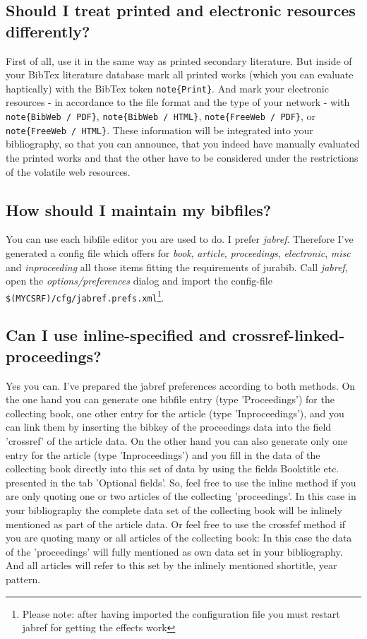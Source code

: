 \documentclass[
  DIV=calc,
  BCOR=5mm,
  11pt,
  headings=small,
  oneside,
  abstract=true,
  toc=bib,
  ngerman,english]{scrartcl}
\begin{document}
\subsection{Should I treat printed and electronic resources differently?}
First of all, use it in the same way as printed secondary literature. But inside
of your BibTex literature database mark all printed works (which you can
evaluate haptically) with the BibTex token \texttt{note\{Print\}}. And mark your
electronic resources - in accordance to the file format and the type of your
network - with \texttt{note\{BibWeb / PDF\}}, \texttt{note\{BibWeb / HTML\}},
\texttt{note\{FreeWeb / PDF\}}, or \texttt{note\{FreeWeb / HTML\}}. These
information will be integrated into your bibliography, so that you can announce,
that you indeed have manually evaluated the printed works and that the other
have to be considered under the restrictions of the volatile web resources.

\subsection{How should I maintain my bibfiles?}
You can use each bibfile editor you are used to do. I prefer \textit{jabref}.
There\-fo\-re I've generated a config file which offers for \textit{book},
\textit{article}, \textit{proceedings}, \textit{elec\-tro\-nic}, \textit{misc}
and \textit{inproceeding} all those items fitting the requirements of jurabib. Call
\textit{jabref}, open the \textit{options/preferences} dialog and import the
config-file \texttt{\$(MYCSRF)/cfg/jabref.prefs.xml}\footnote{Please
note: after having imported the configuration file you must restart jabref for
getting the effects work}.



\subsection{Can I use inline-specified and crossref-linked-proceedings?} 
Yes you can. I've prepared the jabref preferences according to both methods.
On the one hand you can generate one bibfile entry (type 'Proceedings') for the
collecting book, one other entry for the article (type 'Inproceedings'), and you
can link them by inserting the bibkey of the proceedings data into the field
'crossref' of the article data. On the other hand you can also generate only one
entry for the article (type 'Inproceedings') and you fill in the data of the
collecting book directly into this set of data by using the fields Booktitle
etc. presented in the tab 'Optional fields'. So, feel free to use the inline
method if you are only quoting one or two articles of the collecting
'proceedings'. In this case in your bibliography the complete data set of the
collecting book will be inlinely mentioned as part of the article data. Or feel
free to use the crossfef method if you are quoting many or all articles of the
collecting book: In this case the data of the 'proceedings' will fully mentioned
as own data set in your bibliography. And all articles will refer to this set by
the inlinely mentioned shortitle, year pattern.
\end{document}

